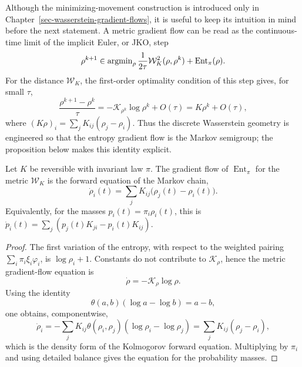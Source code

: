 Although the minimizing-movement construction is introduced only in Chapter~\ref{sec-wasserstein-gradient-flows}, it is useful to keep its intuition in mind before the next statement. A metric gradient flow can be read as the continuous-time limit of the implicit Euler, or JKO, step
\begin{equation}
\label{eq-discrete-markov-jko}
\rho^{k+1}\in\operatorname{argmin}_\rho
\frac{1}{2\tau}\mathcal W_K^2(\rho,\rho^k)+\operatorname{Ent}_\pi(\rho).
\end{equation}
For the distance \(\mathcal W_K\), the first-order optimality condition of this step gives, for small \(\tau\),
\[
\frac{\rho^{k+1}-\rho^k}{\tau}
=-\mathcal K_{\rho^k}\log\rho^k+O(\tau)
=K\rho^k+O(\tau),
\]
where \((K\rho)_i=\sum_jK_{ij}(\rho_j-\rho_i)\). Thus the discrete Wasserstein geometry is engineered so that the entropy gradient flow is the Markov semigroup; the proposition below makes this identity explicit.

\begin{prop}
\label{prop-discrete-markov-entropy-gradient}
Let \(K\) be reversible with invariant law \(\pi\). The gradient flow of \(\operatorname{Ent}_\pi\) for the metric \(\mathcal W_K\) is the forward equation of the Markov chain,
\begin{equation}
\label{eq-discrete-markov-gradient-flow}
\dot\rho_i(t)=\sum_jK_{ij}\bigl(\rho_j(t)-\rho_i(t)\bigr).
\end{equation}
Equivalently, for the masses \(p_i(t)=\pi_i\rho_i(t)\), this is \(\dot p_i(t)=\sum_j(p_j(t)K_{ji}-p_i(t)K_{ij})\).
\end{prop}

\begin{proof}
The first variation of the entropy, with respect to the weighted pairing \(\sum_i\pi_i\xi_i\varphi_i\), is \(\log\rho_i+1\). Constants do not contribute to \(\mathcal K_\rho\), hence the metric gradient-flow equation is
\[
\dot\rho=-\mathcal K_\rho\log\rho.
\]
Using the identity
\[
\theta(a,b)(\log a-\log b)=a-b,
\]
one obtains, componentwise,
\[
\dot\rho_i
=-\sum_jK_{ij}\theta(\rho_i,\rho_j)(\log\rho_i-\log\rho_j)
=
\sum_jK_{ij}(\rho_j-\rho_i),
\]
which is the density form of the Kolmogorov forward equation. Multiplying by \(\pi_i\) and using detailed balance gives the equation for the probability masses.
\end{proof}

